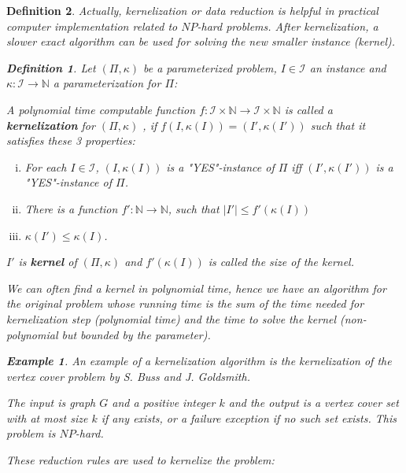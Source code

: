\documentclass[12pt]{article}
\theoremstyle{slplain}
\newtheorem{defi}{Definition}[section]
\newtheorem{exam}{Example}[section]
\begin{document}
\begin{defi}
Actually, kernelization or data reduction is helpful in practical computer implementation related to $NP$-hard problems. After kernelization, a slower exact algorithm can be used for solving the new smaller instance (kernel).

\begin{defi}
Let $(\Pi, \kappa)$ be a parameterized problem, $I\in\mathcal{I}$ an instance and $\kappa: \mathcal{I} \to \mathbb{N}$ a parameterization for $\Pi$:

A polynomial time computable function $f : \mathcal{I} \times \mathbb{N} \to \mathcal{I} \times \mathbb{N}$ is called a
{\bf kernelization} for $(\Pi, \kappa)$ , if $f(I, \kappa(I)) = (I', \kappa(I'))$ such that it satisfies these 3 properties:

\begin{enumerate}[(i)]
\item For each $I \in \mathcal{I}$, $(I, \kappa(I))$ is a "YES"-instance of $\Pi$ iff $(I', \kappa(I'))$ is a "YES"-instance of $\Pi$.

\item There is a function $f': \mathbb{N} \to \mathbb{N}$, such that $|I'| \leq f'(\kappa(I))$

\item $\kappa(I')\leq \kappa(I)$.
\end{enumerate}

$I'$ is {\bf kernel} of $(\Pi, \kappa)$ and $f'(\kappa(I))$ is called the size of the kernel.

\end{defi}




We can often find a kernel in polynomial time, hence we have an algorithm for the original problem whose running time is the sum of the time needed for kernelization step (polynomial time) and the time to solve the kernel (non-polynomial but bounded by the parameter).

\vspace{1cm}
\begin{exam}
An example of a kernelization algorithm is the kernelization of
the vertex cover problem by S. Buss and J. Goldsmith\cite{buss}. 

The input is graph $G$ and a positive integer 
$k$ and the output is a vertex cover set with at most size $k$ if any exists, or
a failure exception if no such set exists. This problem is $NP$-hard. 

These reduction rules are used to kernelize the problem:


\end{exam}
\end{defi}
\end{document}
